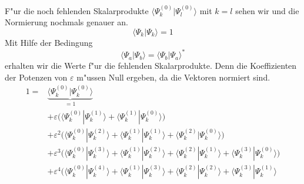 \begin{refsection}
F"ur die noch fehlenden Skalarprodukte $\langle\Psi_k^{(0)}|\Psi_l^{(0)}\rangle$
mit $k=l$ sehen wir und die Normierung nochmals genauer an.
\[
\langle\Psi_k|\Psi_k\rangle=1
\]
Mit Hilfe der Bedingung
\[
\langle\Psi_a|\Psi_b\rangle
=
\langle\Psi_b|\Psi_a\rangle^*
\]
erhalten wir die Werte f"ur die fehlenden Skalarprodukte.
Denn die Koeffizienten der Potenzen von $\varepsilon$ m"ussen Null ergeben,
da die Vektoren normiert sind.
\begin{align*}
1
=
&\underbrace{\langle\Psi_k^{(0)}|\Psi_k^{(0)}\rangle}_{=1}
\\
&+\varepsilon\bigl(\langle\Psi_k^{(0)}|\Psi_k^{(1)}\rangle
+\langle\Psi_k^{(1)}|\Psi_k^{(0)}\rangle\bigr)
\\
&+\varepsilon^2\bigl(\langle\Psi_k^{(0)}|\Psi_k^{(2)}\rangle
+\langle\Psi_k^{(1)}|\Psi_k^{(1)}\rangle
+\langle\Psi_k^{(2)}|\Psi_k^{(0)}\rangle\bigr)
\\
&+\varepsilon^3\bigl(\langle\Psi_k^{(0)}|\Psi_k^{(3)}\rangle
+\langle\Psi_k^{(1)}|\Psi_k^{(2)}\rangle
+\langle\Psi_k^{(2)}|\Psi_k^{(1)}\rangle
+\langle\Psi_k^{(3)}|\Psi_k^{(0)}\rangle\bigr)
\\
&+\varepsilon^4\bigl(\langle\Psi_k^{(0)}|\Psi_k^{(4)}\rangle
+\langle\Psi_k^{(1)}|\Psi_k^{(3)}\rangle
+\langle\Psi_k^{(2)}|\Psi_k^{(2)}\rangle
+\langle\Psi_k^{(3)}|\Psi_k^{(1)}\rangle

\end{align*}
\end{refsection}
